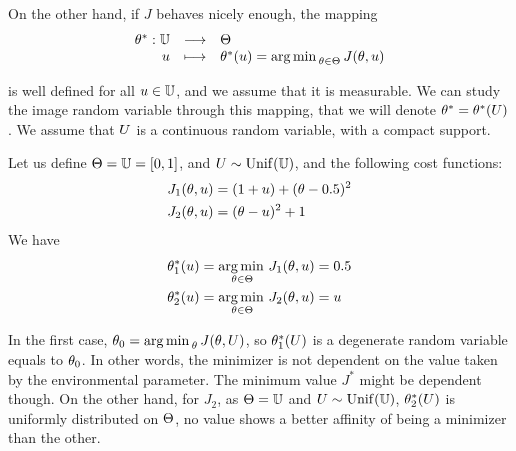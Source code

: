 \documentclass[../../Main_ManuscritThese.tex]{subfiles}
\begin{document}
On the other hand, if $J$ behaves nicely enough, the mapping
\begin{equation}
  \label{eq:def_kstar}
  \begin{array}{rcl}
    \theta^*: \mathbb{U} &\longrightarrow& \Theta \\
    u &\longmapsto& \theta^*(u) = \operatorname*{arg\,min \,}_{\theta \in \Theta} J(\theta, u)
  \end{array}
\end{equation}

is well defined for all $u \in \mathbb{U}$, and we assume that it is measurable. We can study the image random variable through this mapping, that we will denote $\theta^* = \theta^*(U)$.
We assume that $U$ is a continuous random variable, with a compact support.

Let us define $\Theta = \mathbb{U}= [0, 1]$, and $U \sim \mathrm{Unif}(\mathbb{U})$, and the following cost functions:
\begin{align}
  J_1(\theta, u) &= (1+u)+(\theta - 0.5)^2\\
  J_2(\theta, u) &= (\theta-u)^2 + 1
\end{align}
We have
\begin{align}
  \theta^*_1(u) &= \operatorname*{arg\,min \,}_{\theta \in \Theta} J_1(\theta, u) = 0.5 \\
  \theta^*_2(u) &= \operatorname*{arg\,min \,}_{\theta\in\Theta} J_2(\theta, u) = u
\end{align}

In the first case, $\theta_0 = \operatorname*{arg\,min \,}_{\theta} J(\theta, U)$, so $\theta_1^*(U)$ is a degenerate random variable equals to  $\theta_0$. In other words, the minimizer is not dependent on the value taken by the environmental parameter. The minimum value $J^*$ might be dependent though. On the other hand, for $J_2$, as $\Theta=\mathbb{U}$ and $U \sim \mathrm{Unif}(\mathbb{U})$, $\theta_2^*(U)$ is uniformly distributed on $\Theta$, no value shows a better affinity of being a minimizer than the other.
\end{document}
